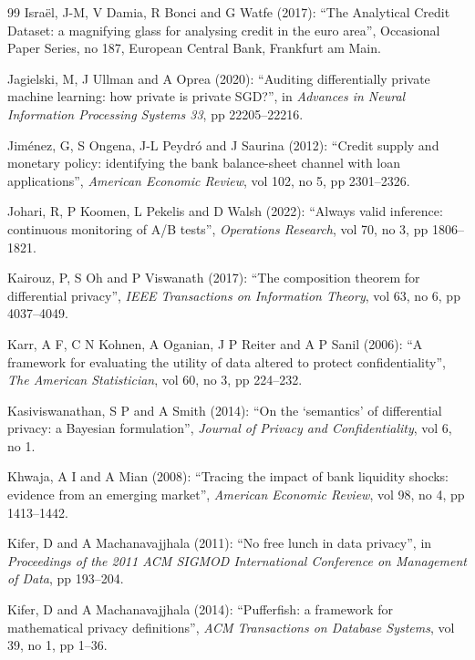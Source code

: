 \documentclass[11pt,a4paper]{article}
\theoremstyle{plain}
\theoremstyle{definition}
\theoremstyle{definition}
\theoremstyle{plain}
\begin{document}
\begin{thebibliography}{99}
Isra\"el, J-M, V Damia, R Bonci and G Watfe (2017): ``The Analytical Credit Dataset: a magnifying glass for analysing credit in the euro area'', Occasional Paper Series, no 187, European Central Bank, Frankfurt am Main.

Jagielski, M, J Ullman and A Oprea (2020): ``Auditing differentially private machine learning: how private is private SGD?'', in \emph{Advances in Neural Information Processing Systems 33}, pp 22205--22216.

Jim\'enez, G, S Ongena, J-L Peydr\'o and J Saurina (2012): ``Credit supply and monetary policy: identifying the bank balance-sheet channel with loan applications'', \emph{American Economic Review}, vol 102, no 5, pp 2301--2326.

Johari, R, P Koomen, L Pekelis and D Walsh (2022): ``Always valid inference: continuous monitoring of A/B tests'', \emph{Operations Research}, vol 70, no 3, pp 1806--1821.

Kairouz, P, S Oh and P Viswanath (2017): ``The composition theorem for differential privacy'', \emph{IEEE Transactions on Information Theory}, vol 63, no 6, pp 4037--4049.

Karr, A F, C N Kohnen, A Oganian, J P Reiter and A P Sanil (2006): ``A framework for evaluating the utility of data altered to protect confidentiality'', \emph{The American Statistician}, vol 60, no 3, pp 224--232.

Kasiviswanathan, S P and A Smith (2014): ``On the `semantics' of differential privacy: a Bayesian formulation'', \emph{Journal of Privacy and Confidentiality}, vol 6, no 1.

Khwaja, A I and A Mian (2008): ``Tracing the impact of bank liquidity shocks: evidence from an emerging market'', \emph{American Economic Review}, vol 98, no 4, pp 1413--1442.

Kifer, D and A Machanavajjhala (2011): ``No free lunch in data privacy'', in \emph{Proceedings of the 2011 ACM SIGMOD International Conference on Management of Data}, pp 193--204.

Kifer, D and A Machanavajjhala (2014): ``Pufferfish: a framework for mathematical privacy definitions'', \emph{ACM Transactions on Database Systems}, vol 39, no 1, pp 1--36.


\end{thebibliography}
\end{document}
